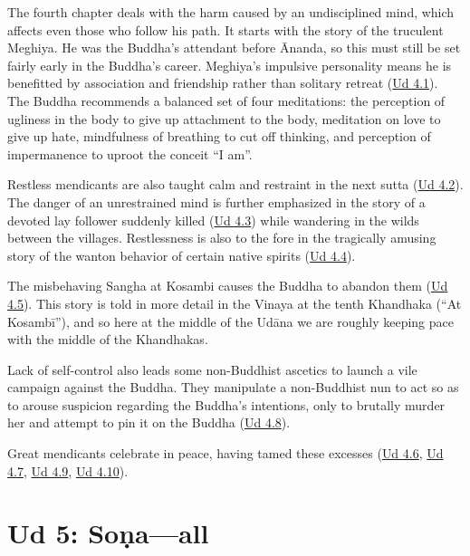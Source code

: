 \documentclass[12pt,openany]{book}%
\begin{document}
The fourth chapter deals with the harm caused by an undisciplined mind, which affects even those who follow his path. It starts with the story of the truculent Meghiya. He was the Buddha’s attendant before Ānanda, so this must still be set fairly early in the Buddha’s career. Meghiya’s impulsive personality means he is benefitted by association and friendship rather than solitary retreat (\href{https://suttacentral.net/ud4.1/en/sujato}{Ud 4.1}). The Buddha recommends a balanced set of four meditations: the perception of ugliness in the body to give up attachment to the body, meditation on love to give up hate, mindfulness of breathing to cut off thinking, and perception of impermanence to uproot the conceit “I am”.

Restless mendicants are also taught calm and restraint in the next sutta (\href{https://suttacentral.net/ud4.2/en/sujato}{Ud 4.2}). The danger of an unrestrained mind is further emphasized in the story of a devoted lay follower suddenly killed (\href{https://suttacentral.net/ud4.3/en/sujato}{Ud 4.3}) while wandering in the wilds between the villages. Restlessness is also to the fore in the tragically amusing story of the wanton behavior of certain native spirits (\href{https://suttacentral.net/ud4.4/en/sujato}{Ud 4.4}). 

The misbehaving Sangha at Kosambi causes the Buddha to abandon them (\href{https://suttacentral.net/ud4.5/en/sujato}{Ud 4.5}). This story is told in more detail in the Vinaya at the tenth Khandhaka (“At \textsanskrit{Kosambī}”), and so here at the middle of the \textsanskrit{Udāna} we are roughly keeping pace with the middle of the Khandhakas. 

Lack of self-control also leads some non-Buddhist ascetics to launch a vile campaign against the Buddha. They manipulate a non-Buddhist nun to act so as to arouse suspicion regarding the Buddha’s intentions, only to brutally murder her and attempt to pin it on the Buddha (\href{https://suttacentral.net/ud4.8/en/sujato}{Ud 4.8}). 

Great mendicants celebrate in peace, having tamed these excesses (\href{https://suttacentral.net/ud4.6/en/sujato}{Ud 4.6}, \href{https://suttacentral.net/ud4.7/en/sujato}{Ud 4.7}, \href{https://suttacentral.net/ud4.9/en/sujato}{Ud 4.9}, \href{https://suttacentral.net/ud4.10/en/sujato}{Ud 4.10}).

\section*{Ud 5: \textsanskrit{Soṇa}—all}
\end{document}
